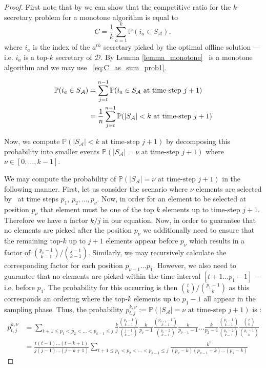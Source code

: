 \begin{proof}
First note that by \citet[Lemma 3.3]{albers2020new} we can show that the competitive ratio for the $k$-secretary problem for a monotone algorithm is equal to 
\begin{equation}
    C = \frac{1}{k}\sum_{a=1}^k \mathbb{P}(i_a \in S_\mathcal{A}), \label{eq:C_as_sum_prob1}
\end{equation}
where $i_a$ is the index of the $a^{th}$ secretary picked by the optimal offline solution ---i.e. $i_a$ is a top-$k$ secretary of $\mathcal{D}$. By Lemma \ref{lemma_monotone} \algoname \ is a monotone algorithm and we may use ~\eqref{eq:C_as_sum_prob1}.

\begin{align}
    \mathbb{P}(i_a \in S_\mathcal{A}) 
    &= \sum_{j=t}^{n-1} \mathbb{P}(i_a \in S_\mathcal{A} \text{ at time-step }j+1) \label{p_picked_equal_not_filled} \\
    &= \frac{1}{n}\sum_{j=t}^{n-1} \mathbb{P}(|S_{\mathcal{A}}| < k \text{ at time-step } j + 1) \notag
\end{align}

Now, we compute $\mathbb{P}(|S_{\mathcal{A}}| < k \text{ at time-step } j+1)$ by decomposing this probability into smaller events  $\mathbb{P}(|S_{\mathcal{A}}| = \nu \text{ at time-step } j+1)$ where $\nu \in [0,\dots,k-1]$.

We may compute the probability of $\mathbb{P}(|S_{\mathcal{A}}| = \nu \text{ at time-step } j+1)$ in the following manner. First, let us consider the scenario where $\nu$ elements are selected by \algoname\ at time steps $p_1$, $p_2, \dots, p_{\nu}$. 
Now, in order for an element to be selected at position $p_\nu$ that element must be one of the top $k$ elements up to time-step $j+1$. Therefore we have a factor $k/j$ in our equation. Now, in order to guarantee that no elements are picked after the position $p_\nu$ we additionally need to ensure that the remaining top-$k$ up to $j+1$ elements appear before $p_\nu$ which results in a factor of ${p_{\nu} - 1 \choose k - 1}/{j-1 \choose k - 1}$. 
Similarly, we may recursively calculate the corresponding factor for each position $p_{\nu-1} \dots p_1$. However, we also need to guarantee that no elements are picked within the time interval $[t+1 \dots p_1-1]$
---i.e. before $p_1$. The probability for this occurring is then ${t \choose k}/{p_1-1 \choose k}$ as this corresponds an ordering where the top-$k$ elements up to $p_1 - 1$ all appear in the sampling phase.
Thus, the probability $p_{t,j}^{k,\nu}:=\mathbb{P}(|S_{\mathcal{A}}| = \nu \text{ at time-step } j+1)$ is :
\begin{align}
    p_{t,j}^{k,\nu}
    &= \sum_{t+1 \leq p_1 < p_2 < \dots <p_{k-1} \leq j}\frac{k}{j} \frac{{p_{\nu} - 1 \choose k-1}}{{j-1 \choose k-1}}\frac{k}{p_{\nu} - 1}
    \frac{{p_{{\nu}-1} - 1 \choose k-1}}{{p_{\nu} - 2 \choose k-1}}\frac{k}{p_{\nu-1} - 1}\dots \frac{k}{p_2 - 1}\frac{{p_1 - 1 \choose k - 1}}{{p_2 - 2 \choose k-1}} \frac{{t \choose k}}{{p_1-1 \choose k}}\\
    & = \frac{t(t-1)\dots(t-k+1)}{j(j-1)\dots (j - k + 1)}\sum_{t+1 \leq p_1 < p_2 < \dots <p_{k-1} \leq j}
    \frac{k^{\nu}}{(p_\nu-k)(p_{\nu-1} - k)\dots(p_1 - k)}
\end{align}


\end{proof}
